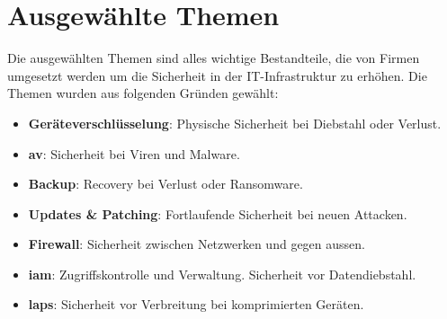 \section{Ausgewählte Themen}
Die ausgewählten Themen sind alles wichtige Bestandteile, die von Firmen umgesetzt werden um die Sicherheit in der IT-Infrastruktur zu erhöhen.
Die Themen wurden aus folgenden Gründen gewählt:

\begin{itemize}
    \item \textbf{Geräteverschlüsselung}: Physische Sicherheit bei Diebstahl oder Verlust.
    \item \textbf{\acrlong{av}}: Sicherheit bei Viren und Malware.
    \item \textbf{Backup}: Recovery bei Verlust oder Ransomware.
    \item \textbf{Updates \& Patching}: Fortlaufende Sicherheit bei neuen Attacken.
    \item \textbf{Firewall}: Sicherheit zwischen Netzwerken und gegen aussen.
    \item \textbf{\acrshort{iam}}: Zugriffskontrolle und Verwaltung. Sicherheit vor Datendiebstahl.
    \item \textbf{\acrshort{laps}}: Sicherheit vor Verbreitung bei komprimierten Geräten.
\end{itemize}